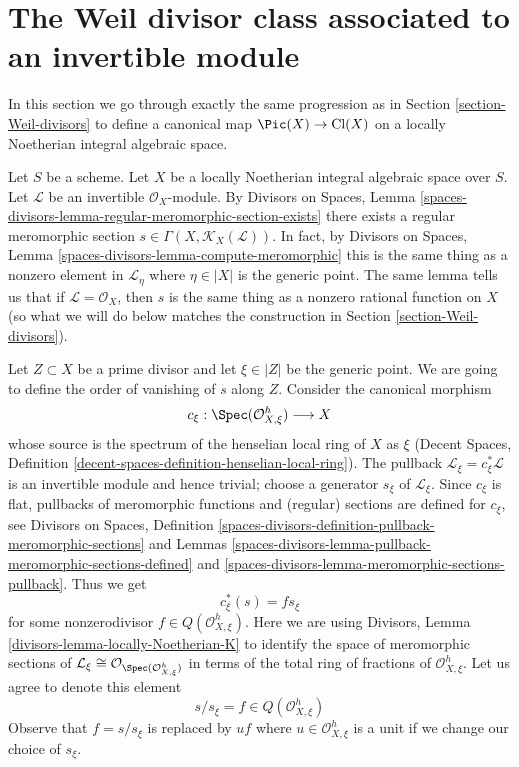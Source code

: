 \section{The Weil divisor class associated to an invertible module}
\label{section-c1}

\noindent
In this section we go through exactly the same progression as in
Section \ref{section-Weil-divisors} to define a canonical map
$\Pic(X) \to \text{Cl}(X)$
on a locally Noetherian integral algebraic space.

\medskip\noindent
Let $S$ be a scheme. Let $X$ be a locally Noetherian integral algebraic space
over $S$. Let $\mathcal{L}$ be an invertible $\mathcal{O}_X$-module.
By Divisors on Spaces, Lemma
\ref{spaces-divisors-lemma-regular-meromorphic-section-exists}
there exists a regular meromorphic section
$s \in \Gamma(X, \mathcal{K}_X(\mathcal{L}))$.
In fact, by Divisors on Spaces, Lemma
\ref{spaces-divisors-lemma-compute-meromorphic}
this is the same thing as a nonzero element in
$\mathcal{L}_\eta$ where $\eta \in |X|$ is the generic point.
The same lemma tells us that if $\mathcal{L} = \mathcal{O}_X$,
then $s$ is the same thing as a nonzero rational function on $X$
(so what we will do below matches the construction in
Section \ref{section-Weil-divisors}).

\medskip\noindent
Let $Z \subset X$ be a prime divisor and let $\xi \in |Z|$ be the generic point.
We are going to define the order of vanishing of $s$ along $Z$.
Consider the canonical morphism
$$
c_\xi : \Spec(\mathcal{O}_{X, \xi}^h) \longrightarrow X
$$
whose source is the spectrum of the henselian local ring of $X$ as $\xi$
(Decent Spaces, Definition \ref{decent-spaces-definition-henselian-local-ring}).
The pullback $\mathcal{L}_\xi = c_\xi^*\mathcal{L}$
is an invertible module and hence trivial; choose a generator $s_\xi$ of
$\mathcal{L}_\xi$. Since $c_\xi$ is flat, pullbacks of meromorphic functions
and (regular) sections are defined for $c_\xi$, see
Divisors on Spaces, Definition
\ref{spaces-divisors-definition-pullback-meromorphic-sections} and
Lemmas \ref{spaces-divisors-lemma-pullback-meromorphic-sections-defined} and
\ref{spaces-divisors-lemma-meromorphic-sections-pullback}.
Thus we get
$$
c_\xi^*(s) = f s_\xi
$$
for some nonzerodivisor $f \in Q(\mathcal{O}_{X, \xi}^h)$.
Here we are using Divisors, Lemma \ref{divisors-lemma-locally-Noetherian-K}
to identify the space of meromorphic sections of
$\mathcal{L}_\xi \cong \mathcal{O}_{\Spec(\mathcal{O}_{X, \xi}^h)}$
in terms of the total ring of fractions of $\mathcal{O}_{X, \xi}^h$.
Let us agree to denote this element
$$
s/s_\xi = f \in  Q(\mathcal{O}_{X, \xi}^h)
$$
Observe that $f = s/s_\xi$
is replaced by $uf$ where $u \in \mathcal{O}_{X, \xi}^h$
is a unit if we change our choice of $s_\xi$.

